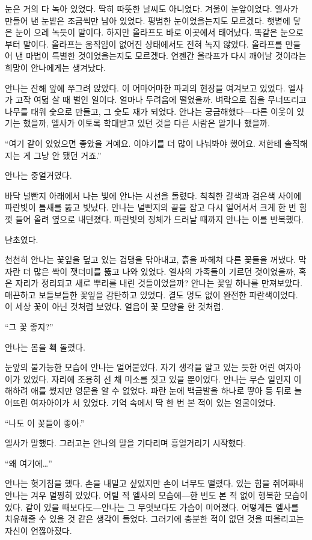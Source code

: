 눈은 거의 다 녹아 있었다. 딱히 따뜻한 날씨도 아니었다. 겨울이 눈앞이었다. 엘사가 만들어 낸 눈밭은 조금씩만 남아 있었다. 평범한 눈이었을는지도 모르겠다. 햇볕에 닿은 눈이 으레 녹듯이 말이다. 하지만 올라프도 바로 이곳에서 태어났다. 똑같은 눈으로부터 말이다. 올라프는 움직임이 없어진 상태에서도 전혀 녹지 않았다. 올라프를 만들어 낸 마법이 특별한 것이었을는지도 모르겠다. 언젠간 올라프가 다시 깨어날 것이라는 희망이 안나에게는 생겨났다.

안나는 잔해 앞에 쭈그려 앉았다. 이 어마어마한 파괴의 현장을 여겨보고 있었다. 엘사가 고작 여덟 살 때 벌인 일이다. 얼마나 두려움에 떨었을까. 벼락으로 집을 무너뜨리고 나무를 태워 숯으로 만들고, 그 숯도 재가 되었다. 안나는 궁금해했다—다른 이웃이 있기는 했을까, 엘사가 이토록 학대받고 있던 것을 다른 사람은 알기나 했을까.

``여기 같이 있었으면 좋았을 거예요. 이야기를 더 많이 나눠봐야 했어요. 저한테 솔직해지는 게 그냥 안 됐던 거죠.''

안나는 중얼거였다.

바닥 널빤지 아래에서 나는 빛에 안나는 시선을 돌렸다. 칙칙한 갈색과 검은색 사이에 파란빛이 틈새를 뚫고 빛났다. 안나는 널빤지의 끝을 잡고 다시 일어서서 크게 한 번 힘껏 들어 올려 옆으로 내던졌다. 파란빛의 정체가 드러날 때까지 안나는 이를 반복했다.

난초였다.

천천히 안나는 꽃잎을 덮고 있는 검댕을 닦아내고, 흙을 파헤쳐 다른 꽃들을 꺼냈다. 막 자란 더 많은 싹이 잿더미를 뚫고 나와 있었다. 엘사의 가족들이 기르던 것이었을까, 혹은 자리가 정리되고 새로 뿌리를 내린 것들이었을까? 안나는 꽃잎 하나를 만져보았다. 매끈하고 보들보들한 꽃잎을 감탄하고 있었다. 결도 멍도 없이 완전한 파란색이었다. 이 세상 꽃이 아닌 것처럼 보였다. 얼음이 꽃 모양을 한 것처럼.

``그 꽃 좋지?''

안나는 몸을 홱 돌렸다.

눈앞의 불가능한 모습에 안나는 얼어붙었다. 자기 생각을 알고 있는 듯한 어린 여자아이가 있었다. 자리에 조용히 선 채 미소를 짓고 있을 뿐이었다. 안나는 무슨 일인지 이해하려 애를 썼지만 영문을 알 수 없었다. 파란 눈에 백금발을 하나로 땋아 등 뒤로 늘어뜨린 여자아이가 서 있었다. 기억 속에서 딱 한 번 본 적이 있는 얼굴이었다.

``나도 이 꽃들이 좋아.''

엘사가 말했다. 그러고는 안나의 말을 기다리며 흥얼거리기 시작했다.

``왜 여기에\ldots''

안나는 헛기침을 했다. 손을 내밀고 싶었지만 손이 너무도 떨렸다. 있는 힘을 쥐어짜내 안나는 겨우 멀쩡히 있었다. 어릴 적 엘사의 모습에—한 번도 본 적 없이 행복한 모습이었다. 같이 있을 때보다도—안나는 그 무엇보다도 가슴이 미어졌다. 어떻게든 엘사를 치유해줄 수 있을 것 같은 생각이 들었다. 그러기에 충분한 적이 없던 것을 떠올리고는 자신이 언짢아졌다.

